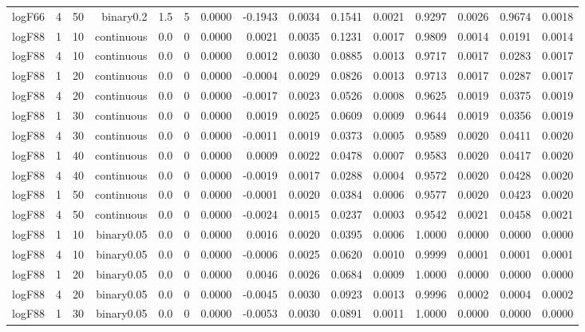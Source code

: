 \begin{longtable}{rrrrrrrrrrrrrrr}
  logF66 & 4 & 50 & binary0.2 & 1.5 & 5 & 0.0000 & -0.1943 & 0.0034 & 0.1541 & 0.0021 & 0.9297 & 0.0026 & 0.9674 & 0.0018 \\ 
  logF88 & 1 & 10 & continuous & 0.0 & 0 & 0.0000 & 0.0021 & 0.0035 & 0.1231 & 0.0017 & 0.9809 & 0.0014 & 0.0191 & 0.0014 \\ 
  logF88 & 4 & 10 & continuous & 0.0 & 0 & 0.0000 & 0.0012 & 0.0030 & 0.0885 & 0.0013 & 0.9717 & 0.0017 & 0.0283 & 0.0017 \\ 
  logF88 & 1 & 20 & continuous & 0.0 & 0 & 0.0000 & -0.0004 & 0.0029 & 0.0826 & 0.0013 & 0.9713 & 0.0017 & 0.0287 & 0.0017 \\ 
  logF88 & 4 & 20 & continuous & 0.0 & 0 & 0.0000 & -0.0017 & 0.0023 & 0.0526 & 0.0008 & 0.9625 & 0.0019 & 0.0375 & 0.0019 \\ 
  logF88 & 1 & 30 & continuous & 0.0 & 0 & 0.0000 & 0.0019 & 0.0025 & 0.0609 & 0.0009 & 0.9644 & 0.0019 & 0.0356 & 0.0019 \\ 
  logF88 & 4 & 30 & continuous & 0.0 & 0 & 0.0000 & -0.0011 & 0.0019 & 0.0373 & 0.0005 & 0.9589 & 0.0020 & 0.0411 & 0.0020 \\ 
  logF88 & 1 & 40 & continuous & 0.0 & 0 & 0.0000 & 0.0009 & 0.0022 & 0.0478 & 0.0007 & 0.9583 & 0.0020 & 0.0417 & 0.0020 \\ 
  logF88 & 4 & 40 & continuous & 0.0 & 0 & 0.0000 & -0.0019 & 0.0017 & 0.0288 & 0.0004 & 0.9572 & 0.0020 & 0.0428 & 0.0020 \\ 
  logF88 & 1 & 50 & continuous & 0.0 & 0 & 0.0000 & -0.0001 & 0.0020 & 0.0384 & 0.0006 & 0.9577 & 0.0020 & 0.0423 & 0.0020 \\ 
  logF88 & 4 & 50 & continuous & 0.0 & 0 & 0.0000 & -0.0024 & 0.0015 & 0.0237 & 0.0003 & 0.9542 & 0.0021 & 0.0458 & 0.0021 \\ 
  logF88 & 1 & 10 & binary0.05 & 0.0 & 0 & 0.0000 & 0.0016 & 0.0020 & 0.0395 & 0.0006 & 1.0000 & 0.0000 & 0.0000 & 0.0000 \\ 
  logF88 & 4 & 10 & binary0.05 & 0.0 & 0 & 0.0000 & -0.0006 & 0.0025 & 0.0620 & 0.0010 & 0.9999 & 0.0001 & 0.0001 & 0.0001 \\ 
  logF88 & 1 & 20 & binary0.05 & 0.0 & 0 & 0.0000 & 0.0046 & 0.0026 & 0.0684 & 0.0009 & 1.0000 & 0.0000 & 0.0000 & 0.0000 \\ 
  logF88 & 4 & 20 & binary0.05 & 0.0 & 0 & 0.0000 & -0.0045 & 0.0030 & 0.0923 & 0.0013 & 0.9996 & 0.0002 & 0.0004 & 0.0002 \\ 
  logF88 & 1 & 30 & binary0.05 & 0.0 & 0 & 0.0000 & -0.0053 & 0.0030 & 0.0891 & 0.0011 & 1.0000 & 0.0000 & 0.0000 & 0.0000 \\ 

\end{longtable}
